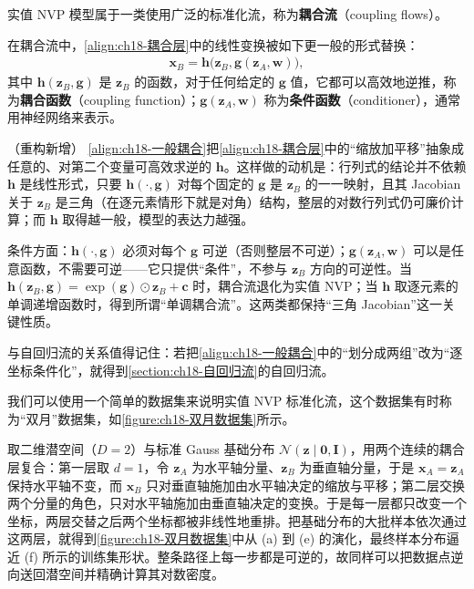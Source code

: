 \documentclass[../../main.tex]{subfiles}
\begin{document}
实值 NVP 模型属于一类使用广泛的标准化流，称为\textbf{耦合流}（coupling flows）。

\begin{definition}[耦合流]\label{definition:ch18-耦合流}
在耦合流中，\eqref{align:ch18-耦合层}中的线性变换被如下更一般的形式替换：
\begin{align}
  \bm{x}_B=\bm{h}\big(\bm{z}_B,\bm{g}(\bm{z}_A,\bm{w})\big),\label{align:ch18-一般耦合}
\end{align}
其中 $\bm{h}(\bm{z}_B,\bm{g})$ 是 $\bm{z}_B$ 的函数，对于任何给定的 $\bm{g}$ 值，它都可以高效地逆推，称为\textbf{耦合函数}（coupling function）；$\bm{g}(\bm{z}_A,\bm{w})$ 称为\textbf{条件函数}（conditioner），通常用神经网络来表示。
\end{definition}

\begin{remark}（重构新增）
\eqref{align:ch18-一般耦合}把\eqref{align:ch18-耦合层}中的“缩放加平移”抽象成任意的、对第二个变量可高效求逆的 $\bm{h}$。这样做的动机是：行列式的结论并不依赖 $\bm{h}$ 是线性形式，只要 $\bm{h}(\cdot,\bm{g})$ 对每个固定的 $\bm{g}$ 是 $\bm{z}_B$ 的一一映射，且其 Jacobian 关于 $\bm{z}_B$ 是三角（在逐元素情形下就是对角）结构，整层的对数行列式仍可廉价计算；而 $\bm{h}$ 取得越一般，模型的表达力越强。

条件方面：$\bm{h}(\cdot,\bm{g})$ 必须对每个 $\bm{g}$ 可逆（否则整层不可逆）；$\bm{g}(\bm{z}_A,\bm{w})$ 可以是任意函数，不需要可逆——它只提供“条件”，不参与 $\bm{z}_B$ 方向的可逆性。当 $\bm{h}(\bm{z}_B,\bm{g})=\exp(\bm{g})\odot\bm{z}_B+\bm{c}$ 时，耦合流退化为实值 NVP；当 $\bm{h}$ 取逐元素的单调递增函数时，得到所谓“单调耦合流”。这两类都保持“三角 Jacobian”这一关键性质。

与自回归流的关系值得记住：若把\eqref{align:ch18-一般耦合}中的“划分成两组”改为“逐坐标条件化”，就得到\cref{section:ch18-自回归流}的自回归流。
\end{remark}

我们可以使用一个简单的数据集来说明实值 NVP 标准化流，这个数据集有时称为“双月”数据集，如\cref{figure:ch18-双月数据集}所示。

\begin{example}[ 双月数据集]\label{example:ch18-双月数据集}
取二维潜空间（$D=2$）与标准 Gauss 基础分布 $\mathcal{N}(\bm{z}\mid\bm{0},\bm{I})$，用两个连续的耦合层复合：第一层取 $d=1$，令 $\bm{z}_A$ 为水平轴分量、$\bm{z}_B$ 为垂直轴分量，于是 $\bm{x}_A=\bm{z}_A$ 保持水平轴不变，而 $\bm{x}_B$ 只对垂直轴施加由水平轴决定的缩放与平移；第二层交换两个分量的角色，只对水平轴施加由垂直轴决定的变换。于是每一层都只改变一个坐标，两层交替之后两个坐标都被非线性地重排。把基础分布的大批样本依次通过这两层，就得到\cref{figure:ch18-双月数据集}中从 (a) 到 (e) 的演化，最终样本分布逼近 (f) 所示的训练集形状。整条路径上每一步都是可逆的，故同样可以把数据点逆向送回潜空间并精确计算其对数密度。
\end{example}
\end{document}
